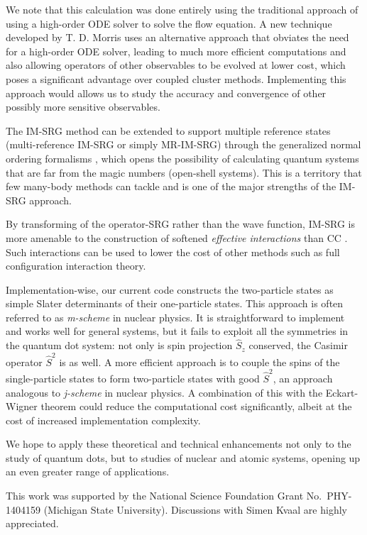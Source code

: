 We note that this calculation was done entirely using the traditional approach of using a high-order ODE solver to solve the flow equation.  A new technique developed by T. D. Morris \cite{PhysRevC.92.034331} uses an alternative approach that obviates the need for a high-order ODE solver, leading to much more efficient computations and also allowing operators of other observables to be evolved at lower cost, which poses a significant advantage over coupled cluster methods.  Implementing this approach would allows us to study the accuracy and convergence of other possibly more sensitive observables.

The IM-SRG method can be extended to support multiple reference states (multi-reference IM-SRG or simply MR-IM-SRG) \cite{PhysRevLett.110.242501,PhysRevC.90.041302} through the generalized normal ordering formalisms \cite{doi:10.1063/1.474405}, which opens the possibility of calculating quantum systems that are far from the magic numbers (open-shell systems).  This is a territory that few many-body methods can tackle and is one of the major strengths of the IM-SRG approach.

By transforming of the operator-SRG rather than the wave function, IM-SRG is more amenable to the construction of softened \textit{effective interactions} than CC \cite{Hergert2016165}.  Such interactions can be used to lower the cost of other methods such as full configuration interaction theory.

Implementation-wise, our current code constructs the two-particle states as simple Slater determinants of their one-particle states.  This approach is often referred to as \textit{m-scheme} in nuclear physics.  It is straightforward to implement and works well for general systems, but it fails to exploit all the symmetries in the quantum dot system: not only is spin projection $\hat S_z$ conserved, the Casimir operator $\hat S^2$ is as well.  A more efficient approach is to couple the spins of the single-particle states to form two-particle states with good $\hat S^2$, an approach analogous to \textit{j-scheme} in nuclear physics.  A combination of this with the Eckart-Wigner theorem could reduce the computational cost significantly, albeit at the cost of increased implementation complexity.

We hope to apply these theoretical and technical enhancements not only to the study of quantum dots, but to studies of nuclear and atomic systems, opening up an even greater range of applications.

\begin{acknowledgments}
  This work was supported by the National Science Foundation Grant No.\ PHY-1404159 (Michigan State University).  Discussions with Simen Kvaal are highly appreciated.
\end{acknowledgments}





